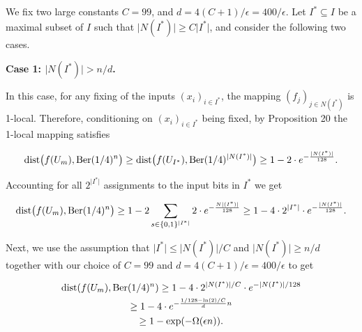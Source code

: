 We fix two large constants $C=99$, and $d=4(C+1)/\epsilon=400/\epsilon$.
Let $I^{*}\subseteq I$ be a maximal subset of $I$ such that $\lvert N(I^{*})\rvert\geq C\lvert I^{*}\rvert$, and consider the following two cases.\par





\par\medskip\noindent\textbf{Case 1: $\lvert N(I^{*})\rvert>n/d$.}\par




In this case, for any fixing of the inputs $(x_{i})_{i\in I^{*}}$,
the mapping $(f_{j})_{j\in N(I^{*})}$ is 1-local. Therefore, conditioning on $(x_{i})_{i\in I^{*}}$ being fixed, by Proposition 20 the 1-local mapping satisfies\par


\[\begin{gathered}
\displaystyle\mathrm{dist}\bigl(f(U_{m}),\textnormal{Ber}(1/4)^{n}\bigr)\geq\mathrm{dist}\bigl(f(U_{I^{*}}),\textnormal{Ber}(1/4)^{\lvert N(I^{*})\rvert}\bigr)\geq 1-2\cdot e^{-\frac{\lvert N(I^{*})\rvert}{128}}.
\end{gathered}\]


Accounting for all $2^{\lvert I^{*}\rvert}$ assignments to the input bits in $I^{*}$ we get\par


\[\begin{gathered}
\displaystyle\mathrm{dist}\bigl(f(U_{m}),\textnormal{Ber}(1/4)^{n}\bigr)\geq 1-2\sum_{s\in\{0,1\}^{\lvert I^{*}\rvert}}2\cdot e^{-\frac{N\lvert(I^{*})\rvert}{128}}\geq 1-4\cdot 2^{\lvert I^{*}\rvert}\cdot e^{-\frac{\lvert N(I^{*})\rvert}{128}}.
\end{gathered}\]


Next, we use the assumption that $\lvert I^{*}\rvert\leq\lvert N(I^{*})\rvert/C$ and $\lvert N(I^{*})\rvert\geq n/d$ together with our choice of $C=99$ and $d=4(C+1)/\epsilon=400/\epsilon$ to get\par


\[\begin{gathered}
\displaystyle\mathrm{dist}(f(U_{m}),\textnormal{Ber}(1/4)^{n}) \displaystyle\geq \displaystyle 1-4\cdot 2^{\lvert N(I^{*})\rvert/C}\cdot e^{-\lvert N(I^{*})\rvert/128} \\
\displaystyle\geq \displaystyle 1-4\cdot e^{-\frac{1/128-\ln(2)/C}{d}n} \\
\displaystyle\geq \displaystyle 1-\exp(-\Omega(\epsilon n)).
\end{gathered}\]


